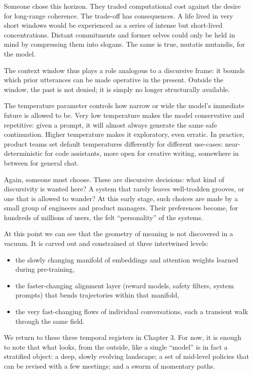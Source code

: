 \documentclass[12pt,a4paper]{report}
\begin{document}
Someone chose this horizon. They traded computational cost against the desire for long-range coherence. The trade-off has consequences. A life lived in very short windows would be experienced as a series of intense but short-lived concentrations. Distant commitments and former selves could only be held in mind by compressing them into slogans. The same is true, mutatis mutandis, for the model.

The context window thus plays a role analogous to a discursive frame: it bounds which prior utterances can be made operative in the present. Outside the window, the past is not denied; it is simply no longer structurally available.

The temperature parameter controls how narrow or wide the model's immediate future is allowed to be. Very low temperature makes the model conservative and repetitive: given a prompt, it will almost always generate the same safe continuation. Higher temperature makes it exploratory, even erratic. In practice, product teams set default temperatures differently for different use-cases: near-deterministic for code assistants, more open for creative writing, somewhere in between for general chat.

Again, someone must choose. These are discursive decisions: what kind of discursivity is wanted here? A system that rarely leaves well-trodden grooves, or one that is allowed to wander? At this early stage, such choices are made by a small group of engineers and product managers. Their preferences become, for hundreds of millions of users, the felt ``personality'' of the systems.

At this point we can see that the geometry of meaning is not discovered in a vacuum. It is carved out and constrained at three intertwined levels:

\begin{itemize}
  \item the slowly changing manifold of embeddings and attention weights learned during pre-training,
  \item the faster-changing alignment layer (reward models, safety filters, system prompts) that bends trajectories within that manifold,
  \item the very fast-changing flows of individual conversations, each a transient walk through the same field.
\end{itemize}

We return to these three temporal registers in Chapter 3. For now, it is enough to note that what looks, from the outside, like a single ``model'' is in fact a stratified object: a deep, slowly evolving landscape; a set of mid-level policies that can be revised with a few meetings; and a swarm of momentary paths.
\end{document}
